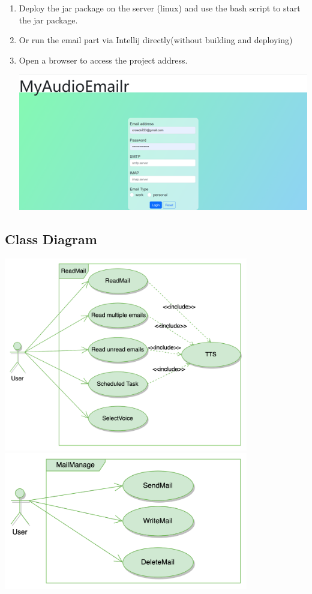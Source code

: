 \documentclass{article}
\begin{document}
\begin{enumerate}
\item Deploy the jar package on the server (linux) and use the bash script to start the jar package.
\item Or run the email part via Intellij directly(without building and deploying)
\item Open a browser to access the project address.
    \begin{center}
        \includegraphics[]{User Guide login page.png}
    \end{center}
\end{enumerate}
\subsection{Class Diagram}
\includegraphics[width=0.8\textwidth]{UserCase_ReadMail.png} \\
\includegraphics[width=0.8\textwidth]{UserCase_MailManage.png}
\end{document}
